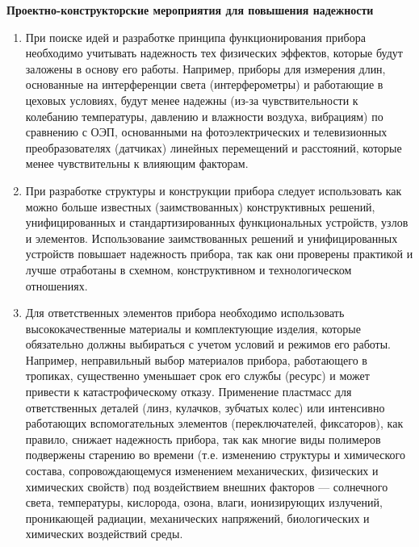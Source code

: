 \begin{flushleft}
\textbf{Проектно-конструкторские мероприятия для повышения надежности}
\end{flushleft}

\begin{enumerate}
\item При поиске идей и разработке принципа функционирования прибора необходимо учитывать надежность тех физических эффектов, которые будут заложены в основу его работы. Например, приборы для измерения длин, основанные на интерференции света (интерферометры) и работающие в цеховых условиях, будут менее надежны (из-за чувствительности к колебанию температуры, давлению и влажности воздуха, вибрациям) по сравнению с ОЭП, основанными на фотоэлектрических и телевизионных преобразователях (датчиках) линейных перемещений и расстояний, которые менее чувствительны к влияющим факторам.
\item При разработке структуры и конструкции прибора следует использовать как можно больше известных (заимствованных) конструктивных решений, унифицированных и стандартизированных функциональных устройств, узлов и элементов.
Использование заимствованных решений и унифицированных устройств повышает надежность прибора, так как они проверены практикой и лучше отработаны в схемном, конструктивном и технологическом отношениях.
\item Для ответственных элементов прибора необходимо использовать высококачественные материалы и комплектующие изделия, которые обязательно должны выбираться с учетом условий и режимов его работы. Например, неправильный выбор материалов прибора, работающего в тропиках, существенно уменьшает срок его службы (ресурс) и может привести к катастрофическому отказу. Применение пластмасс для ответственных деталей (линз, кулачков, зубчатых колес) или интенсивно работающих вспомогательных элементов (переключателей, фиксаторов), как правило, снижает надежность прибора, так как многие виды полимеров подвержены старению во времени (т.е. изменению структуры и химического состава, сопровождающемуся изменением механических, физических и химических свойств) под воздействием внешних факторов --- солнечного света, температуры, кислорода, озона, влаги, ионизирующих излучений, проникающей радиации, механических напряжений, биологических и химических воздействий среды.


\end{enumerate}
